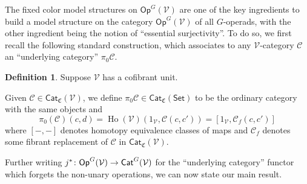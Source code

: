 \documentclass[a4paper,10pt
,draft
]{article}%
\numberwithin{equation}{section}
\numberwithin{figure}{section}
\theoremstyle{definition} %
\newtheorem{definition}[equation]{Definition}%
\newcommand{\Cat}{\mathsf{Cat}}
\DeclareMathOperator{\Ho}{Ho}
\newcommand{\V}{\ensuremath{\mathcal V}}
\newcommand{\1}{\ensuremath{\mathbbm 1}}%
\begin{document}
The fixed color model structures
on $\mathsf{Op}^G(\V)$
are one of the key ingredients to build a model structure
on the category 
$\mathsf{Op}^G(\V)$
of all $G$-operads,
with the other ingredient being the notion of ``essential surjectivity''.
To do so, we first recall the following standard construction, 
which associates to any $\V$-category $\mathcal{C}$
an ``underlying category'' $\pi_0 \mathcal{C}$.

\begin{definition}
	Suppose $\V$ has a cofibrant unit.

	Given $\mathcal C \in \Cat_{\mathfrak{C}}(\V)$,
	we define $\pi_0 \mathcal C \in \Cat_{\mathfrak{C}}(\mathsf{Set})$ 
	to be the ordinary category with the same objects and
\[
	\pi_0(\mathcal{C})(c,d)=
	\Ho(\V)(1_\V, \mathcal C(c,c'))=
	[1_\V, \mathcal{C}_f(c,c')]
\]
where $[-,-]$ denotes homotopy equivalence classes of maps
and $\mathcal{C}_f$ denotes some fibrant replacement of
$\mathcal C$ in $\Cat_{\mathfrak{C}}(\V)$.
\end{definition}

Further writing 
$j^{\**} \colon 
\mathsf{Op}^G(\V) \to \mathsf{Cat}^G(\V)$
for the ``underlying category''
functor which forgets the non-unary operations, 
we can now state our main result.
\end{document}

